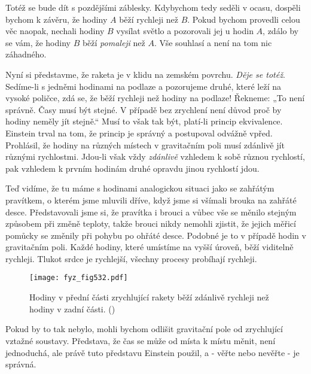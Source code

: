{    Totéž se bude dít s pozdějšími záblesky. Kdybychom tedy seděli v ocasu, dospěli bychom k 
    závěru, že hodiny \(A\) běží rychleji než \(B\). Pokud bychom provedli celou věc naopak, 
    nechali hodiny \(B\) vysílat světlo a pozorovali jej u hodin \(A\), zdálo by se vám, že hodiny 
    \(B\) běží \emph{pomaleji} než \(A\). Vše souhlasí a není na tom nic záhadného.
    
    Nyní si představme, že raketa je v klidu na zemském povrchu. \emph{Děje se totéž}. Sedíme-li s 
    jedněmi hodinami na podlaze a pozorujeme druhé, které leží na vysoké poličce, zdá se, že běží 
    rychleji než hodiny na podlaze! Řekneme: „To není správně. Časy musí být stejné. V případě bez 
    zrychlení není důvod proč by hodiny neměly jít stejně.“ Musí to však tak být, platí-li princip 
    ekvivalence. Einstein trval na tom, že princip je správný a postupoval odvážně vpřed. 
    Prohlásil, že hodiny na různých místech v gravitačním poli musí zdánlivě jít různými 
    rychlostmi. Jdou-li však vždy \emph{zdánlivě} vzhledem k sobě různou rychlostí, pak vzhledem k 
    prvním hodinám druhé opravdu jinou rychlostí jdou.
    
    Teď vidíme, že tu máme s hodinami analogickou situaci jako se zahřátým pravítkem, o kterém jsme 
    mluvili dříve, když jsme si všímali brouka na zahřáté desce. Představovali jsme si, že pravítka 
    i brouci a vůbec vše se měnilo stejným způsobem při změně teploty, takže brouci nikdy nemohli 
    zjistit, že jejich měřicí pomůcky se změnily při pohybu po ohřáté desce. Podobné je to v 
    případě hodin v gravitačním poli. Každé hodiny, které umístíme na vyšší úroveň, běží viditelně 
    rychleji. Tlukot srdce je rychlejší, všechny procesy probíhají rychleji.

    \begin{figure}[ht!] %
      \centering
      \texttt{[image: fyz\_fig532.pdf]}
      \caption{Hodiny v přední části zrychlující rakety běží zdánlivě rychleji než hodiny v zadní 
               části.
               (\cite[s.~787]{Feynman02})}
      \label{fyz:fig532}
    \end{figure}
    
    Pokud by to tak nebylo, mohli bychom odlišit gravitační pole od zrychlující vztažné soustavy. 
    Představa, že čas se může od místa k místu měnit, není jednoduchá, ale právě tuto představu 
    Einstein použil, a - věřte nebo nevěřte - je správná.
    
}
